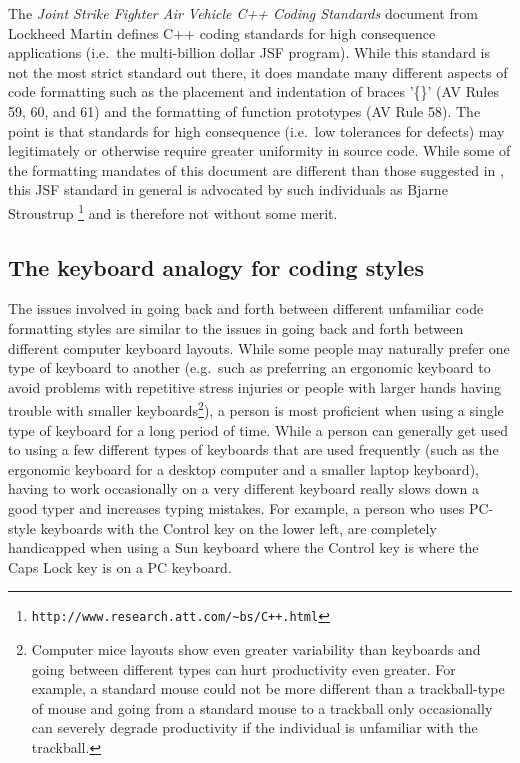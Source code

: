 The {}\textit{Joint Strike Fighter Air Vehicle C++ Coding Standards} document
{}\cite{JSFAVC++CodingStandards2005} from Lockheed Martin defines C++ coding
standards for high consequence applications (i.e.\ the multi-billion dollar
JSF program).  While this standard is not the most strict standard out there,
it does mandate many different aspects of code formatting such as the
placement and indentation of braces '\{\}' (AV Rules 59, 60, and 61) and the
formatting of function prototypes (AV Rule 58).  The point is that standards
for high consequence (i.e.\ low tolerances for defects) may legitimately or
otherwise require greater uniformity in source code.  While some of the
formatting mandates of this document are different than those suggested in
{}\cite[Chapter 31]{CodeComplete2nd04}, this JSF standard in general is
advocated by such individuals as Bjarne Stroustrup
{}\footnote{{}\texttt{http://www.research.att.com/\~{}bs/C++.html}} and is
therefore not without some merit.


%
\subsection{The keyboard analogy for coding styles}
%

The issues involved in going back and forth between different unfamiliar code
formatting styles are similar to the issues in going back and forth between
different computer keyboard layouts.  While some people may naturally prefer
one type of keyboard to another (e.g.\ such as preferring an ergonomic
keyboard to avoid problems with repetitive stress injuries or people with
larger hands having trouble with smaller keyboards\footnote{Computer mice
layouts show even greater variability than keyboards and going between
different types can hurt productivity even greater.  For example, a standard
mouse could not be more different than a trackball-type of mouse and going
from a standard mouse to a trackball only occasionally can severely degrade
productivity if the individual is unfamiliar with the trackball.}), a person
is most proficient when using a single type of keyboard for a long period of
time.  While a person can generally get used to using a few different types of
keyboards that are used frequently (such as the ergonomic keyboard for a
desktop computer and a smaller laptop keyboard), having to work occasionally
on a very different keyboard really slows down a good typer and increases
typing mistakes.  For example, a person who uses PC-style keyboards with the
Control key on the lower left, are completely handicapped when using a Sun
keyboard where the Control key is where the Caps Lock key is on a PC keyboard.

